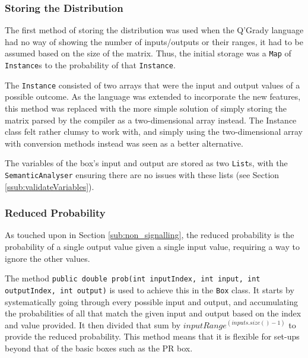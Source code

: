 \documentclass[report.tex]{subfiles}
\begin{document}
\subsubsection{Storing the Distribution} %
\label{ssub:storing_the_distribution}
The first method of storing the distribution was used when the Q'Grady language
had no way of showing the number of inputs/outputs or their ranges, it had to be
assumed based on the size of the matrix. Thus, the initial storage was a
\texttt{Map} of \texttt{Instance}s to the probability of that \texttt{Instance}.

The \texttt{Instance} consisted of two arrays that were the input and output
values of a possible outcome. As the language was extended to incorporate
the new features, this method was replaced with the more simple solution of
simply storing the matrix parsed by the compiler as a two-dimensional array
instead. The Instance class felt rather clumsy to work with, and simply using
the two-dimensional array with conversion methods instead was seen as a better
alternative.

The variables of the box's input and output are stored as two \texttt{List}s,
with the \texttt{SemanticAnalyser} ensuring there are no issues with these
lists (see Section \ref{ssub:validateVariables}).

\subsubsection{Reduced Probability} %
\label{ssub:reduced_probability}
As touched upon in Section \ref{sub:non_signalling}, the reduced probability is
the probability of a single output value given a single input value, requiring
a way to ignore the other values.

 

The method \texttt{public double prob(int inputIndex, int input,
int outputIndex, int output)} is used to achieve this in the \texttt{Box} class.
It starts by systematically going through every possible input and output, and
accumulating the probabilities of all that match the given input and output
based on the index and value provided. It then divided that sum by
\(inputRange ^ (inputs.size() - 1)\) to provide the reduced probability. This
method means that it is flexible for set-ups beyond that of the basic boxes such
as the PR box.
\end{document}
